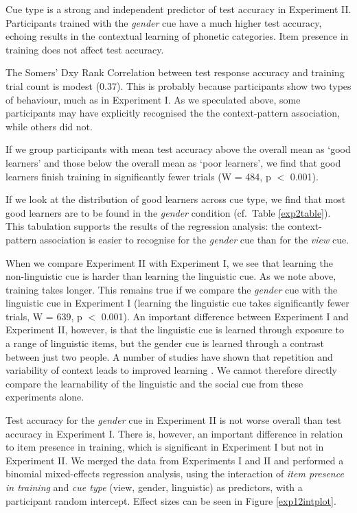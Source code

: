 \documentclass{frontiersSCNS} %
\begin{document}
Cue type is a strong and independent predictor of test accuracy in Experiment II. Participants trained with the \emph{gender} cue have a much higher test accuracy, echoing results in the contextual learning of phonetic categories. Item presence in training does not affect test accuracy. 

The Somers' Dxy Rank Correlation between test  response accuracy and training trial count is modest (0.37). This is probably because participants show two types of behaviour, much as in Experiment I. As we speculated above, some participants may have explicitly recognised the   
the context-pattern association, while others did not.  

If we group participants with mean test accuracy above the overall mean as `good learners' and those below the overall mean as `poor learners', we find that good learners finish training in significantly fewer trials (W = 484, p $<$ 0.001).

If we look at the distribution of good learners across cue type, we find that most good learners are to be found in the \emph{gender} condition (cf.\ Table \ref{exp2table}). This tabulation supports the results of the regression analysis: the context-pattern association is easier to recognise for the \emph{gender} cue than for the \emph{view} cue.

When we compare Experiment II with Experiment I, we see that learning the non-linguistic cue is harder than learning the linguistic cue. As we note above, training takes longer. This remains true if we compare the \emph{gender} cue with the linguistic cue in Experiment I (learning the linguistic cue takes significantly fewer trials, W = 639, p $<$ 0.001).   An important difference between Experiment I and Experiment II, however, is that the linguistic cue is learned through exposure to a range of linguistic items, but the gender cue is learned through a contrast between just two people.  A number of studies have shown that repetition and variability of context leads to improved learning \citep{gomez2002variability,rost2009speaker}.  We cannot therefore directly compare the learnability of the linguistic and the social cue from these experiments alone.


Test accuracy for the \emph{gender} cue in Experiment II is not worse overall than test accuracy in Experiment I. There is, however, an important difference in relation to item presence in training, which is significant in Experiment I but not in Experiment II. We merged the data from Experiments I and II and performed a binomial mixed-effects regression analysis, using the interaction of \emph{item presence in training} and \emph{cue type} (view, gender, linguistic) as predictors, with a participant random intercept. Effect sizes can be seen in Figure \ref{exp12intplot}.
\end{document}
